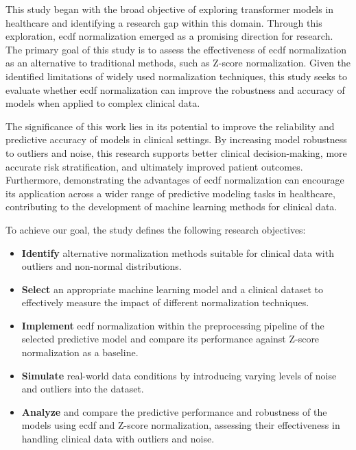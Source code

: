 This study began with the broad objective of exploring transformer models in healthcare and identifying a research gap within this domain. Through this exploration, \gls{ecdf} normalization emerged as a promising direction for research. The primary goal of this study is to assess the effectiveness of \gls{ecdf} normalization as an alternative to traditional methods, such as Z-score normalization. Given the identified limitations of widely used normalization techniques, this study seeks to evaluate whether \gls{ecdf} normalization can improve the robustness and accuracy of models when applied to complex clinical data.

The significance of this work lies in its potential to improve the reliability and predictive accuracy of models in clinical settings. By increasing model robustness to outliers and noise, this research supports better clinical decision-making, more accurate risk stratification, and ultimately improved patient outcomes. Furthermore, demonstrating the advantages of \gls{ecdf} normalization can encourage its application across a wider range of predictive modeling tasks in healthcare, contributing to the development of machine learning methods for clinical data.

To achieve our goal, the study defines the following research objectives:

\begin{itemize}
    \item \textbf{Identify} alternative normalization methods suitable for clinical data with outliers and non-normal distributions.
    \item \textbf{Select} an appropriate machine learning model and a clinical dataset to effectively measure the impact of different normalization techniques.
    \item \textbf{Implement} \gls{ecdf} normalization within the preprocessing pipeline of the selected predictive model and compare its performance against Z-score normalization as a baseline.
    \item \textbf{Simulate} real-world data conditions by introducing varying levels of noise and outliers into the dataset.
    \item \textbf{Analyze} and compare the predictive performance and robustness of the models using \gls{ecdf} and Z-score normalization, assessing their effectiveness in handling clinical data with outliers and noise.
\end{itemize}



